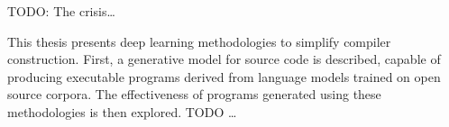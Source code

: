 

TODO: The crisis\ldots

This thesis presents deep learning methodologies to simplify compiler construction. First, a generative model for source code is described, capable of producing executable programs derived from language models trained on open source corpora. The effectiveness of programs generated using these methodologies is then explored. TODO \ldots
